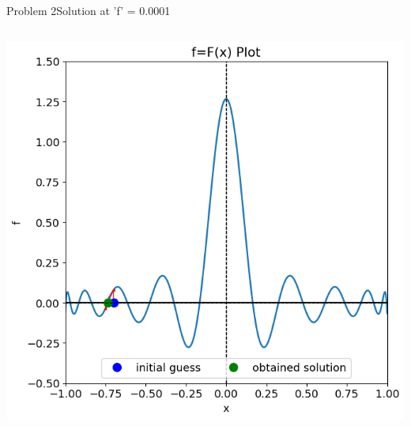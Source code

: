 \documentclass{beamer}
\begin{document}
\begin{frame}{Problem 2}{Solution at 'f' = 0.0001}
\begin{columns}
\begin{block}{}
            \includegraphics[width=\textwidth]{Figures/prob2_sol12.png}
        \end{block}
    \end{columns}
\end{frame}
\end{document}
